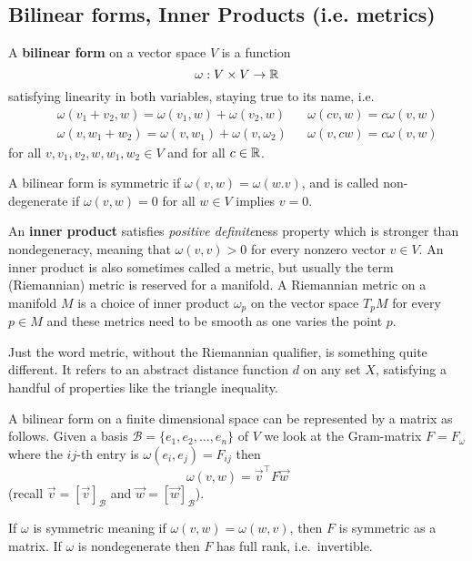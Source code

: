 \documentclass[12pt]{amsart}
\begin{document}
\subsection*{Bilinear forms, Inner Products (i.e. metrics)}

A {\bf bilinear form} on a vector space $V$ is a function
\[
	\omega : V \times V \to \mathbb{R}
\]
satisfying linearity in both variables, staying true to its name, i.e.
\begin{align*}
	&& \omega(v_1 + v_2, w) = \omega(v_1, w) + \omega(v_2, w) && \omega(cv, w) = c\omega(v,w)\\
	&& \omega(v, w_1 + w_2) = \omega(v, w_1) + \omega(v, \omega_2) && \omega(v, cw) = c\omega(v,w)
\end{align*}
for all $v,v_1, v_2, w, w_1, w_2 \in V$ and for all $c \in \mathbb{R}$.

A bilinear form is symmetric if $\omega(v,w) = \omega(w.v)$, and is called non-degenerate if $\omega(v,w) = 0$ for all $w \in V$ implies $v = 0$.

An {\bf inner product} satisfies \emph{positive definite}ness property which is stronger than nondegeneracy, meaning that $\omega(v,v)>0$ for every nonzero vector $v \in V$. An inner product is also sometimes called a metric, but usually the term (Riemannian) metric is reserved for a manifold. A Riemannian metric on a manifold $M$ is a choice of inner product $\omega_p$ on the vector space $T_p M$ for every $p \in M$ and these metrics need to be smooth as one varies the point $p$. 

\begin{remark}
Just the word metric, without the Riemannian qualifier, is something quite different. It refers to an abstract distance function $d$ on any set $X$, satisfying a handful of properties like the triangle inequality.
\end{remark}

A bilinear form on a finite dimensional space can be represented by a matrix as follows. Given a basis $\mathcal{B} = \{e_1, e_2, \ldots, e_n\}$ of $V$ we look at the Gram-matrix $F = F_\omega$ where the $ij$-th entry is $\omega(e_i, e_j) = F_{ij}$ then
\[
	\omega(v,w) = \vec{v}^\top F \vec{w}
\]
(recall $\vec{v} = [\vec{v}]_{\mathcal{B}}$ and $\vec{w} = [\vec{w}]_{\mathcal{B}}$).

If $\omega$ is symmetric meaning if $\omega(v,w) = \omega(w,v)$, then $F$ is symmetric as a matrix. If $\omega$ is nondegenerate then $F$ has full rank, i.e.\ invertible.
\end{document}
